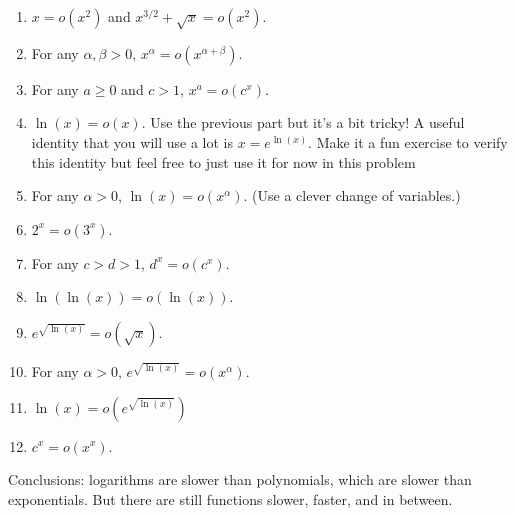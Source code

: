 \documentclass[12pt]{article}
\begin{document}
\begin{enumerate}
\begin{enumerate}

\item $x = o(x^2)$ and $x^{3/2} + \sqrt{x} = o(x^2)$.

\vfill

\item For any $\alpha,\beta>0$, $x^{\alpha} = o(x^{\alpha+\beta})$.

\vfill

\item For any $a\geq 0$ and $c > 1$, $x^a = o(c^x)$.

\vfill

\item $\ln(x) = o(x)$. Use the previous part but it's a bit tricky! A useful identity that you will use a lot is $x=e^{\ln(x)}$. Make it a fun exercise to verify this identity but feel free to just use it for now in this problem 

\vfill

\vfill

\item For any $\alpha > 0$, $\ln(x) = o(x^\alpha)$. (Use a clever change of variables.)

\vfill

\vfill

\item $2^x = o(3^x)$.

\vfill

\item For any $c > d > 1$, $d^x = o(c^x)$.

\vfill

\item $\ln(\ln(x)) = o(\ln(x))$.

\vfill

\item $e^{\sqrt{\ln(x)}} = o(\sqrt{x})$.

\vfill

\vfill

\item For any $\alpha > 0$, $e^{\sqrt{\ln(x)}} = o(x^\alpha)$.

\vfill

\vfill

\item $\ln(x) = o(e^{\sqrt{\ln(x)}})$

\vfill

\vfill

\item $c^x = o(x^x)$.

\vfill

\end{enumerate}

Conclusions: logarithms are slower than polynomials, which are slower than exponentials. But there are still functions slower, faster, and in between.


\end{enumerate}
\end{document}
